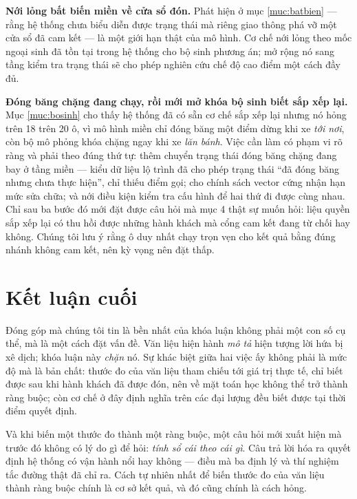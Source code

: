 \textbf{Nới lỏng bất biến miền về cửa sổ đón.} Phát hiện ở mục \ref{muc:batbien} --- rằng hệ thống chưa biểu
diễn được trạng thái mà riêng giao thông phá vỡ một cửa sổ đã cam kết --- là một giới hạn thật
của mô hình. Cơ chế nới lỏng theo mốc ngoại sinh đã tồn tại trong hệ thống cho bộ sinh phương án;
mở rộng nó sang tầng kiểm tra trạng thái sẽ cho phép nghiên cứu chế độ cao điểm một cách đầy đủ.

\textbf{Đóng băng chặng đang chạy, rồi mới mở khóa bộ sinh biết sắp xếp lại.} Mục
\ref{muc:bosinh} cho thấy hệ thống đã có sẵn cơ chế sắp xếp lại nhưng nó hỏng trên 18 trên 20
ô, vì mô hình miền chỉ đóng băng một điểm dừng khi xe \emph{tới nơi}, còn bộ mô phỏng khóa chặng
ngay khi xe \emph{lăn bánh}. Việc cần làm có phạm vi rõ ràng và phải theo đúng thứ tự: thêm
chuyển trạng thái đóng băng chặng đang bay ở tầng miền --- kiểu dữ liệu lộ trình đã cho phép
trạng thái ``đã đóng băng nhưng chưa thực hiện'', chỉ thiếu điểm gọi; cho chính sách vector cứng
nhận hạn mức sửa chữa; và nới điều kiện kiểm tra cấu hình để hai thứ đi được cùng nhau. Chỉ sau
ba bước đó mới đặt được câu hỏi mà mục 4 thật sự muốn hỏi: liệu quyền sắp xếp lại có thu hồi
được những hành khách mà cổng cam kết đang từ chối hay không. Chúng tôi lưu ý rằng ô duy nhất
chạy trọn vẹn cho kết quả bằng đúng nhánh không cam kết, nên kỳ vọng nên đặt thấp.

\section{Kết luận cuối}

Đóng góp mà chúng tôi tin là bền nhất của khóa luận không phải một con số cụ thể, mà là một cách
đặt vấn đề. Văn liệu hiện hành \emph{mô tả} hiện tượng lời hứa bị xê dịch; khóa luận này
\emph{chặn} nó. Sự khác biệt giữa hai việc ấy không phải là mức độ mà là bản chất: thước đo của
văn liệu tham chiếu tới giá trị thực tế, chỉ biết được sau khi hành khách đã được đón, nên về
mặt toán học không thể trở thành ràng buộc; còn cơ chế ở đây định nghĩa trên các đại lượng đều
biết được tại thời điểm quyết định.

Và khi biến một thước đo thành một ràng buộc, một câu hỏi mới xuất hiện mà trước đó không có lý
do gì để hỏi: \emph{tính sổ cái theo cái gì}. Câu trả lời hóa ra quyết định hệ thống có vận hành
nổi hay không --- điều mà ba định lý và thí nghiệm tắc đường thật đã chỉ ra. Cách tự nhiên nhất
để biến thước đo của văn liệu thành ràng buộc chính là cơ sở kết quả, và đó cũng chính là cách
hỏng.
